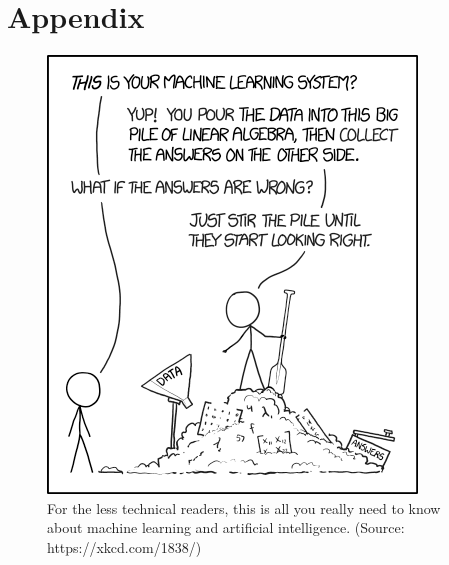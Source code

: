 \documentclass{notes}
\begin{document}
  \section{Appendix}
    \begin{figure}
      \label{fig:xkcd-ml}
    \centering
      \includegraphics[width=0.8\linewidth]{figures/xkcd-ml.png}
    \caption{For the less technical readers, this is all you really need to know about machine learning and artificial intelligence. (Source: https://xkcd.com/1838/)}
    \end{figure}
\end{document}
